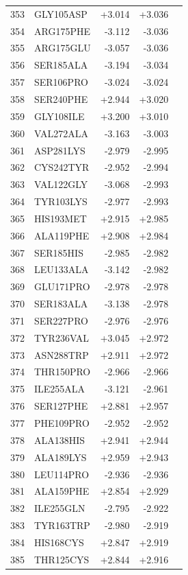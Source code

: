 \begin{longtable}{r l r r c}
353 & GLY105ASP & +3.014 & +3.036 &  \\
354 & ARG175PHE & -3.112 & -3.036 &  \\
355 & ARG175GLU & -3.057 & -3.036 &  \\
356 & SER185ALA & -3.194 & -3.034 &  \\
357 & SER106PRO & -3.024 & -3.024 &  \\
358 & SER240PHE & +2.944 & +3.020 &  \\
359 & GLY108ILE & +3.200 & +3.010 &  \\
360 & VAL272ALA & -3.163 & -3.003 &  \\
361 & ASP281LYS & -2.979 & -2.995 &  \\
362 & CYS242TYR & -2.952 & -2.994 &  \\
363 & VAL122GLY & -3.068 & -2.993 &  \\
364 & TYR103LYS & -2.977 & -2.993 &  \\
365 & HIS193MET & +2.915 & +2.985 &  \\
366 & ALA119PHE & +2.908 & +2.984 &  \\
367 & SER185HIS & -2.985 & -2.982 &  \\
368 & LEU133ALA & -3.142 & -2.982 &  \\
369 & GLU171PRO & -2.978 & -2.978 &  \\
370 & SER183ALA & -3.138 & -2.978 &  \\
371 & SER227PRO & -2.976 & -2.976 &  \\
372 & TYR236VAL & +3.045 & +2.972 &  \\
373 & ASN288TRP & +2.911 & +2.972 &  \\
374 & THR150PRO & -2.966 & -2.966 &  \\
375 & ILE255ALA & -3.121 & -2.961 &  \\
376 & SER127PHE & +2.881 & +2.957 &  \\
377 & PHE109PRO & -2.952 & -2.952 &  \\
378 & ALA138HIS & +2.941 & +2.944 &  \\
379 & ALA189LYS & +2.959 & +2.943 &  \\
380 & LEU114PRO & -2.936 & -2.936 &  \\
381 & ALA159PHE & +2.854 & +2.929 &  \\
382 & ILE255GLN & -2.795 & -2.922 &  \\
383 & TYR163TRP & -2.980 & -2.919 &  \\
384 & HIS168CYS & +2.847 & +2.919 &  \\
385 & THR125CYS & +2.844 & +2.916 &  \\

\end{longtable}
